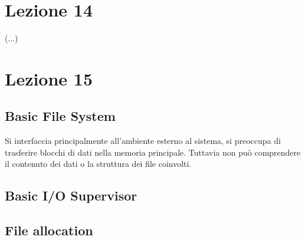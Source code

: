 \documentclass[12pt, a4paper]{article}
\begin{document}
	
	
	\section*{Lezione 14}
	(...)
	
	
	
	\section*{Lezione 15}
	
	
	\subsection*{Basic File System}
	Si interfaccia principalmente all'ambiente esterno al sistema, si preoccupa di trasferire blocchi di dati nella memoria principale. Tuttavia non può comprendere il contenuto dei dati o la struttura dei file coinvolti.
	
	\subsection*{Basic I/O Supervisor}
	
	\subsection*{File allocation}
	
	
	
	
\end{document}
